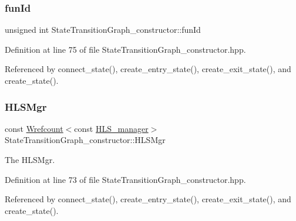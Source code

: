 \subsubsection{\texorpdfstring{fun\+Id}{funId}}
{\footnotesize\ttfamily unsigned int State\+Transition\+Graph\+\_\+constructor\+::fun\+Id\hspace{0.3cm}{\ttfamily [private]}}



Definition at line 75 of file State\+Transition\+Graph\+\_\+constructor.\+hpp.



Referenced by connect\+\_\+state(), create\+\_\+entry\+\_\+state(), create\+\_\+exit\+\_\+state(), and create\+\_\+state().

\mbox{\label{classStateTransitionGraph__constructor_a7ff10711b43bdd70928e531ca60fbbb6}} 
\subsubsection{\texorpdfstring{H\+L\+S\+Mgr}{HLSMgr}}
{\footnotesize\ttfamily const \hyperlink{classWrefcount}{Wrefcount}$<$const \hyperlink{classHLS__manager}{H\+L\+S\+\_\+manager}$>$ State\+Transition\+Graph\+\_\+constructor\+::\+H\+L\+S\+Mgr\hspace{0.3cm}{\ttfamily [private]}}



The H\+L\+S\+Mgr. 



Definition at line 73 of file State\+Transition\+Graph\+\_\+constructor.\+hpp.



Referenced by connect\+\_\+state(), create\+\_\+entry\+\_\+state(), create\+\_\+exit\+\_\+state(), and create\+\_\+state().

\mbox{\label{classStateTransitionGraph__constructor_ac895cf64e96b2d84f4706f81b0cf09b7}} 
